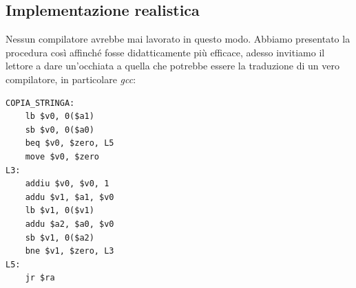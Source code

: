\documentclass[class=book, crop=false]{standalone}
\begin{document}
\subsection{Implementazione realistica}
Nessun compilatore avrebbe mai lavorato in questo modo. Abbiamo presentato la procedura così affinché fosse didatticamente più efficace, adesso invitiamo il lettore a dare un'occhiata a quella che potrebbe essere la traduzione di un vero compilatore, in particolare \emph{gcc}:
\begin{verbatim}
COPIA_STRINGA:
	lb $v0, 0($a1)
	sb $v0, 0($a0)
	beq $v0, $zero, L5
	move $v0, $zero
L3:
	addiu $v0, $v0, 1
	addu $v1, $a1, $v0
	lb $v1, 0($v1)
	addu $a2, $a0, $v0
	sb $v1, 0($a2)
	bne $v1, $zero, L3
L5:
	jr $ra
\end{verbatim}
\end{document}
